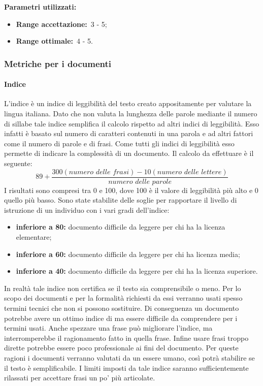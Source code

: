 				\textbf{Parametri utilizzati:}
				\begin{itemize}
					\item \textbf{Range accettazione:}\ 3 - 5;
					\item \textbf{Range ottimale:}\ 4 - 5.
				\end{itemize}
		\subsubsection{Metriche per i documenti}
			\label{sec:3.7.2}
			\paragraph{Indice }
				\label{sec:3.7.2.1}
				L'indice  è un indice di leggibilità del testo creato appositamente per valutare la lingua italiana. Dato che non valuta la lunghezza delle parole mediante il numero di sillabe tale indice semplifica il calcolo rispetto ad altri indici di leggibilità. Esso infatti è basato sul numero di caratteri contenuti in una parola e ad altri fattori come il numero di parole e di frasi. Come tutti gli indici di leggibilità esso permette di indicare la complessità di un documento. Il calcolo da effettuare è il seguente:
				\[89+\frac{300(numero\,\, delle\,\, frasi) - 10(numero\,\, delle\,\, lettere)}{numero\,\, delle\,\, parole}\]
				I risultati sono compresi tra 0 e 100, dove 100 è il valore di leggibilità più alto e 0 quello più basso. Sono state stabilite delle soglie per rapportare il livello di istruzione di un individuo con i vari gradi dell'indice:
				\begin{itemize}
					\item \textbf{inferiore a 80:} documento difficile da leggere per chi ha la licenza elementare;
					\item \textbf{inferiore a 60:} documento difficile da leggere per chi ha licenza media;
					\item \textbf{inferiore a 40:} documento difficile da leggere per chi ha la licenza superiore.
				\end{itemize}
				In realtà tale indice non certifica se il testo sia comprensibile o meno. Per lo scopo dei documenti e per la formalità richiesti da essi verranno usati spesso termini tecnici che non si possono sostituire. Di conseguenza un documento potrebbe avere un ottimo indice di  ma essere difficile da comprendere per i termini usati. Anche spezzare una frase può migliorare l'indice, ma interromperebbe il ragionamento fatto in quella frase. Infine usare frasi troppo dirette potrebbe essere poco professionale ai fini del documento. Per queste ragioni i documenti verranno valutati da un essere umano, così potrà stabilire se il testo è semplificabile. I limiti imposti da tale indice saranno sufficientemente rilassati per accettare frasi un po' più articolate.
				
